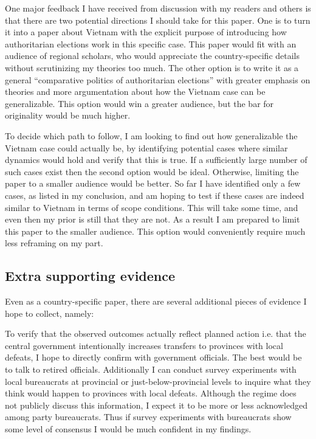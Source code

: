 \documentclass[12pt]{article}\usepackage[]{graphicx}\usepackage[]{color}
\newcommand{\1}{\mathbbm{1}}
\begin{document}
One major feedback I have received from discussion with my readers and others is that there are two potential directions I should take for this paper. One is to turn it into a paper about Vietnam with the explicit purpose of introducing how authoritarian elections work in this specific case. This paper would fit with an audience of regional scholars, who would appreciate the country-specific details without scrutinizing my theories too much. The other option is to write it as a general ``comparative politics of authoritarian elections'' with greater emphasis on theories and more argumentation about how the Vietnam case can be generalizable. This option would win a greater audience, but the bar for originality would be much higher.

To decide which path to follow, I am looking to find out how generalizable the Vietnam case could actually be, by identifying potential cases where similar dynamics would hold and verify that this is true. If a sufficiently large number of such cases exist then the second option would be ideal. Otherwise, limiting the paper to a smaller audience would be better. So far I have identified only a few cases, as listed in my conclusion, and am hoping to test if these cases are indeed similar to Vietnam in terms of scope conditions. This will take some time, and even then my prior is still that they are not. As a result I am prepared to limit this paper to the smaller audience. This option would conveniently require much less reframing on my part.

\subsection{Extra supporting evidence}

Even as a country-specific paper, there are several additional pieces of evidence I hope to collect, namely:

To verify that the observed outcomes actually reflect planned action i.e. that the central government intentionally increases transfers to provinces with local defeats, I hope to directly confirm with government officials. The best would be to talk to retired officials. Additionally I can conduct survey experiments with local bureaucrats at provincial or just-below-provincial levels to inquire what they think would happen to provinces with local defeats. Although the regime does not publicly discuss this information, I expect it to be more or less acknowledged among party bureaucrats. Thus if survey experiments with bureaucrats show some level of consensus I would be much confident in my findings.
\end{document}

